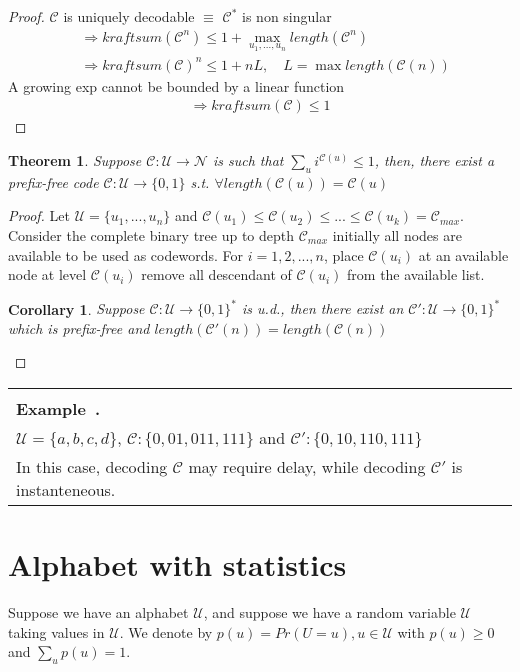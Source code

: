 \documentclass{article}
\newcounter{example}[section]
\newenvironment{example}
    {
    \refstepcounter{example}
    \begin{center}
	    \begin{tabular}{|p{0.8\textwidth}|}
		    \hline\\
			\textbf{Example~\theexample.}\\
		    }
		    {
		    \\\hline
	    \end{tabular}
    \end{center}
    }
\newtheorem{theorem}{Theorem}[section]
\newtheorem{corollary}{Corollary}[theorem]
\def\U{\mathcal{U}}
\def\N{\mathcal{N}}
\def\C{\mathcal{C}}
\begin{document}
\begin{proof}
  $\C$ is uniquely decodable $\equiv$ $\C^*$ is non singular
  \begin{align*}
    &\Rightarrow kraftsum(\C^n) \leq 1 + \max _{u_1, ..., u_n} length(\C^n) \\
    &\Rightarrow kraftsum(\C)^n \leq 1 + n L, \quad L = \max length(\C(n))
  \end{align*}
  A growing exp cannot be bounded by a linear function 
  \begin{align*}
    \Rightarrow kraftsum(\C) \leq 1
  \end{align*}
\end{proof}

\begin{theorem}
  Suppose $\C : \U \rightarrow \N$ is such that $\sum_u i^{\C(u)} \leq 1$, then, there exist a prefix-free code $\C: \U \rightarrow \{0, 1\}$ s.t. $\forall length(\C(u)) = \C(u)$
\end{theorem}

\begin{proof}
  Let $\U = \{u_1, ..., u_n\}$ and $\C(u_1) \leq \C(u_2) \leq ... \leq \C(u_k) = \C_{max}$.
  Consider the complete binary tree up to depth $\C_{max}$ initially all nodes are available to be used as codewords.
  For $i = 1, 2, ..., n$, place $\C(u_i)$ at an available node at level $\C(u_i)$ remove all descendant of $\C(u_i)$ from the available list.

  \begin{corollary}
    Suppose $\C: \U \rightarrow \{0, 1\}^*$ is u.d., then there exist an $\C': \U \rightarrow \{0, 1\}^*$ which is prefix-free and $length(\C'(n)) = length(\C(n))$
  \end{corollary}
\end{proof}

\begin{example}
  $\U = \{a, b, c, d\}$, $\C: \{0, 01, 011, 111\}$ and $\C': \{0, 10, 110, 111\}$\\
  In this case, decoding $\C$ may require delay, while decoding $\C'$ is instanteneous.
\end{example}


\section{Alphabet with statistics}

Suppose we have an alphabet $\U$, and suppose we have a random variable $\U$ taking values in $\U$. We denote by $p(u) = Pr(U = u), u \in \U$ with $p(u) \geq 0$ and $\sum_u p(u) = 1$.\\
\end{document}

